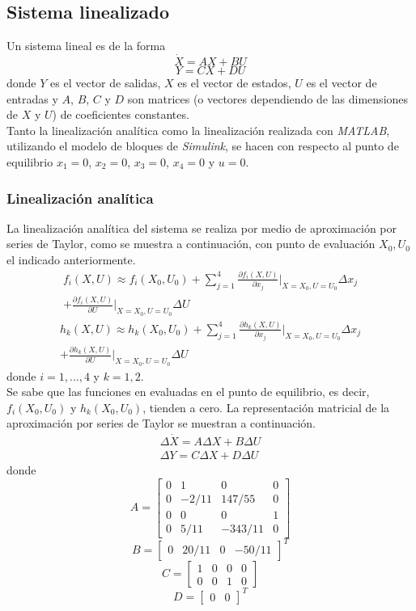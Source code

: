 \documentclass{ieeeaccess}
\begin{document}
\subsection{Sistema linealizado}
Un sistema lineal es de la forma
\[\dot{X}=AX+BU\]
\[Y=CX+DU\]
donde $Y$ es el vector de salidas, $X$ es el vector de estados, $U$ es el vector
de entradas y $A$, $B$, $C$ y $D$ son matrices (o vectores dependiendo de las
dimensiones de $X$ y $U$) de coeficientes constantes.\\

Tanto la linealización analítica como la linealización realizada con
\textit{MATLAB}, utilizando el modelo de bloques de \textit{Simulink},
se hacen con respecto al punto de equilibrio $x_1=0$, $x_2=0$, $x_3=0$, $x_4=0$ y $u=0$.

\subsubsection{Linealización analítica}
La linealización analítica del sistema se realiza por medio de aproximación por series de Taylor, como se muestra a continuación, con punto de evaluación $X_0, U_0$ el indicado anteriormente.
\[\begin{split}
f_i(X, U) \approx f_i(X_0, U_0) + \sum_{j=1}^{4}\frac{\partial f_i(X, U)}{\partial x_j}\bigg\rvert_{X=X_0, U=U_0}\Delta x_j \\
+\frac{\partial f_i(X, U)}{\partial U}\bigg\rvert_{X=X_0, U=U_0}\Delta U
\end{split}\]
\[\begin{split}
h_k(X, U) \approx h_k(X_0, U_0) + \sum_{j=1}^{4}\frac{\partial h_k(X, U)}{\partial x_j}\bigg\rvert_{X=X_0, U=U_0}\Delta x_j\\
+ \frac{\partial h_k(X, U)}{\partial U}\bigg\rvert_{X=X_0, U=U_0}\Delta U
\end{split}\]
donde $i=1,...,4$ y $k=1,2$.\\

Se sabe que las funciones en evaluadas en el punto de equilibrio, es decir, $f_i(X_0, U_0)$ y $h_k(X_0, U_0)$, tienden a cero. La representación matricial de la aproximación por series de Taylor se muestran a continuación.
\begin{eqnarray}
\Delta\dot{X} = A\Delta X + B\Delta U\\
\Delta Y = C\Delta X + D\Delta U
\end{eqnarray}
donde
\[A =\begin{bmatrix}
    0 & 1 & 0 & 0\\
    0 & -2/11 & 147/55 & 0\\
    0 & 0 & 0 & 1\\
    0 & 5/11 & -343/11 & 0
\end{bmatrix}
\]
\[B = \begin{bmatrix}
    0 &
    20/11 &
    0 &
    -50/11
\end{bmatrix}^{T}\]
\[C = \begin{bmatrix}
    1 & 0 & 0 & 0\\
    0 & 0 & 1 & 0
\end{bmatrix}\]
\[D = \begin{bmatrix}
    0&
    0
\end{bmatrix}^{T}\]
\end{document}
